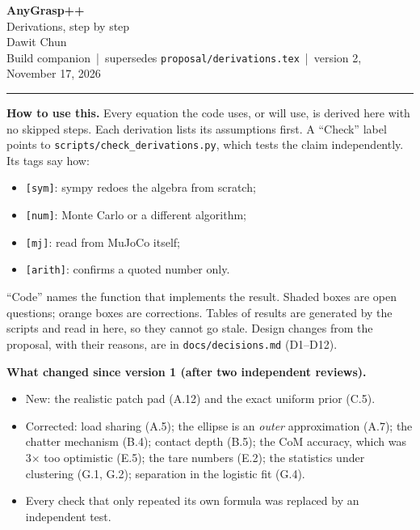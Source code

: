 \documentclass[11pt]{article}
\numberwithin{equation}{section}
\begin{document}
\begin{center}
{\sffamily\bfseries\LARGE AnyGrasp++}\\[3pt]
{\sffamily\large Derivations, step by step}\\[8pt]
Dawit Chun\\[1pt]
{\small Build companion \,|\, supersedes \texttt{proposal/derivations.tex} \,|\, version 2, November 17, 2026}
\end{center}
\vspace{-4pt}
\noindent\rule{\textwidth}{0.4pt}

\textbf{How to use this.} Every equation the code uses, or will use, is derived here with no skipped steps. Each derivation lists its assumptions first. A ``Check'' label points to \texttt{scripts/check\_derivations.py}, which tests the claim independently. Its tags say how:
\begin{itemize}
  \item \texttt{[sym]}: sympy redoes the algebra from scratch;
  \item \texttt{[num]}: Monte Carlo or a different algorithm;
  \item \texttt{[mj]}: read from MuJoCo itself;
  \item \texttt{[arith]}: confirms a quoted number only.
\end{itemize}
``Code'' names the function that implements the result. Shaded boxes are open questions; orange boxes are corrections. Tables of results are generated by the scripts and read in here, so they cannot go stale. Design changes from the proposal, with their reasons, are in \texttt{docs/decisions.md} (D1--D12).

\textbf{What changed since version 1 (after two independent reviews).}
\begin{itemize}
  \item New: the realistic patch pad (A.12) and the exact uniform prior (C.5).
  \item Corrected: load sharing (A.5); the ellipse is an \emph{outer} approximation (A.7); the chatter mechanism (B.4); contact depth (B.5); the CoM accuracy, which was 3$\times$ too optimistic (E.5); the tare numbers (E.2); the statistics under clustering (G.1, G.2); separation in the logistic fit (G.4).
  \item Every check that only repeated its own formula was replaced by an independent test.
\end{itemize}

\tableofcontents

\end{document}

